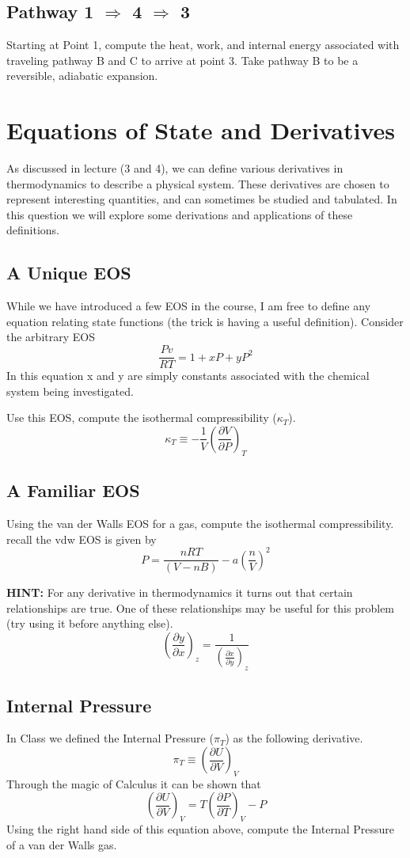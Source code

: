 \documentclass{article}
\newcommand{\be}{\begin{equation}}
\newcommand{\ee}{\end{equation}}
\newcommand{\pd}{\partial}
\begin{document}
 \subsection{Pathway 1 $\Rightarrow$ 4 $\Rightarrow$ 3}
Starting at Point 1, compute the heat, work, and internal energy associated with traveling pathway B and C to arrive at point 3.
Take pathway B to be a reversible, adiabatic expansion. 

 
 
\section{Equations of State and Derivatives}
As discussed in lecture (3 and 4), we can define various derivatives in thermodynamics to describe a physical system. 
These derivatives are chosen to represent interesting quantities, and can sometimes be studied and tabulated. 
In this question we will explore some derivations and applications of these definitions.

\subsection{A Unique EOS}
While we have introduced a few EOS in the course, I am free to define any equation relating state functions (the trick is having a useful definition). 
Consider the arbitrary EOS
\be
\frac{Pv}{RT} = 1 + xP + yP^2
\ee
In this equation x and y are simply constants associated with the chemical system being investigated. 

Use this EOS, compute the isothermal compressibility ($\kappa_T$). 
\be
\kappa_T \equiv -\frac{1}{V}\left(\frac{\pd V}{\pd P}\right)_T
\ee

\subsection{A Familiar EOS}
Using the van der Walls EOS for a gas, compute the isothermal compressibility. 
recall the vdw EOS is given by 
\be
P = \frac{nRT}{(V-nB)} - a\left(\frac{n}{V}\right)^2
\ee

\textbf{HINT:} For any derivative in thermodynamics it turns out that certain relationships are true. 
One of these relationships may be useful for this problem (try using it before anything else).  
\be
\left(\frac{\pd y}{\pd x}\right)_z = \frac{1}{\left(\frac{\pd x}{\pd y}\right)_z}
\ee

\subsection{Internal Pressure}
In Class we defined the Internal Pressure ($\pi_T$) as the following derivative. 
\be
\pi_T \equiv \left(\frac{\pd U}{\pd V}\right)_V
\ee
Through the magic of Calculus it can be shown that
\be
\left(\frac{\pd U}{\pd V}\right)_V = T\left(\frac{\pd P}{\pd T}\right)_V - P
\ee
Using the right hand side of this equation above, compute the Internal Pressure of a van der Walls gas.
\end{document}
